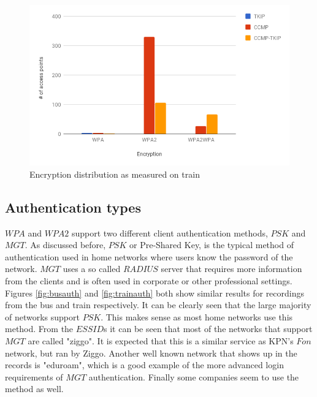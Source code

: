\documentclass[letterpaper, 10 pt, conference]{ieeeconf}  %
\begin{document}
\begin{figure}[h]
\includegraphics[scale=0.4]{Figures/CipherTrain.png}
\caption{Encryption distribution as measured on train}
\label{fig:traincipher}
\end{figure}




\subsection{Authentication types}
$WPA$ and $WPA2$ support two different client authentication methods, $PSK$ and $MGT$. As discussed before, $PSK$ or Pre-Shared Key, is the typical method of authentication used in home networks where users know the password of the network. $MGT$ uses a so called $RADIUS$ server that requires more information from the clients and is often used in corporate or other professional settings. Figures \ref{fig:busauth} and \ref{fig:trainauth} both show similar results for recordings from the bus and train respectively. It can be clearly seen that the large majority of networks support $PSK$. This makes sense as most home networks use this method. From the $ESSID$s it can be seen that most of the networks that support $MGT$ are called "ziggo". It is expected that this is a similar service as KPN's $Fon$ network, but ran by Ziggo. Another well known network that shows up in the records is "eduroam", which is a good example of the more advanced login requirements of $MGT$ authentication. Finally some companies seem to use the method as well.
\end{document}
